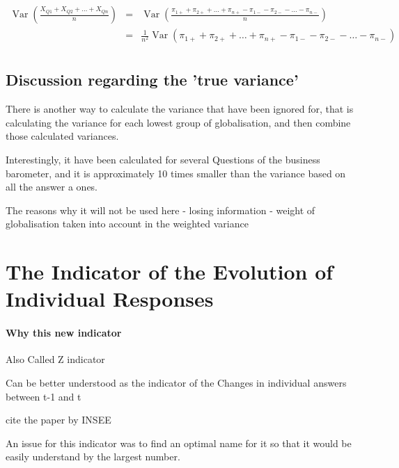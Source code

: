 \documentclass[12pt,a4paper,oneside]{book}
\DeclareMathOperator{\Var}{Var}
\begin{document}
\begin{eqnarray}
    \Var \left(\frac{X_{Q1} + X_{Q2} + \ldots + X_{Qn}}{n} \right) 
    &=& \Var \left(\frac{\pi_{1+} + \pi_{2+} + \ldots + \pi_{n+} - \pi_{1-} - \pi_{2-} - \ldots - \pi_{n-} }{n} \right) \nonumber \\
    &=& \frac{1}{n^2} \Var \left(\pi_{1+} + \pi_{2+} + \ldots + \pi_{n+} - \pi_{1-} - \pi_{2-} - \ldots - \pi_{n-} \right) \nonumber \\
\end{eqnarray}


\newpage

\section{Discussion regarding the 'true variance'}

There is another way to calculate the variance that have been ignored for, that is calculating the variance for each lowest group of globalisation, and then combine those calculated variances.


Interestingly, it have been calculated for several Questions of the business barometer, and it is approximately 10 times smaller than the variance based on all the answer a ones.



The reasons why it will not be used here
- losing information
- weight of globalisation taken into account in the weighted variance




\chapter{The Indicator of the Evolution of Individual Responses}

 \subsubsection{Why this new indicator}

Also Called Z indicator

Can be better understood as the indicator of the Changes in individual answers between t-1 and t

cite the paper by INSEE %


 An issue for this indicator was to find an optimal name for it so that it would be easily understand by the largest number.
 
 
\end{document}
